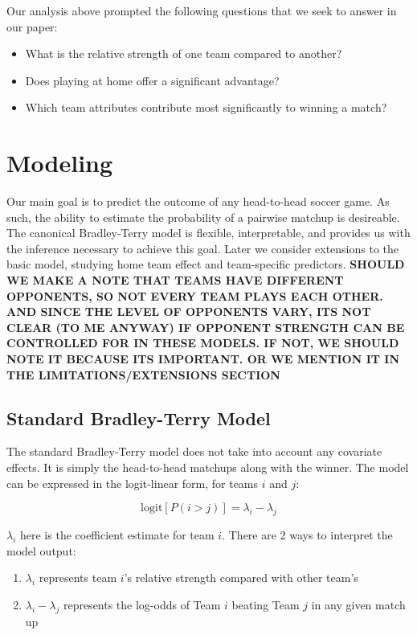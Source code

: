 \documentclass{article}
\begin{document}
Our analysis above prompted the following questions that we seek to answer in our paper:

\begin{itemize}
	\item What is the relative strength of one team compared to another?
	\item Does playing at home offer a significant advantage?
	\item Which team attributes contribute most significantly to winning a match?
\end{itemize}

\section{Modeling}

Our main goal is to predict the outcome of any head-to-head soccer game. As such, the ability to estimate the probability of a pairwise matchup is desireable. The canonical Bradley-Terry model is flexible, interpretable, and provides us with the inference necessary to achieve this goal. Later we consider extensions to the basic model, studying home team effect and team-specific predictors. \textbf{SHOULD WE MAKE A NOTE THAT TEAMS HAVE DIFFERENT OPPONENTS, SO NOT EVERY TEAM PLAYS EACH OTHER. AND SINCE THE LEVEL OF OPPONENTS VARY, ITS NOT CLEAR  (TO ME ANYWAY) IF OPPONENT STRENGTH CAN BE CONTROLLED FOR IN THESE MODELS. IF NOT, WE SHOULD NOTE IT BECAUSE ITS IMPORTANT. OR WE MENTION IT IN THE LIMITATIONS/EXTENSIONS SECTION}

\subsection{Standard Bradley-Terry Model}

The standard Bradley-Terry model does not take into account any covariate effects. It is simply the head-to-head matchups along with the winner. The model can be expressed in the logit-linear form, for teams $i$ and $j$:

$$\text{logit}[P(i > j)] = \lambda_i - \lambda_j$$

$\lambda_i$ here is the coefficient estimate for team $i$. There are 2 ways to interpret the model output:

\begin{enumerate}
	\item $\lambda_i$ represents team $i$'s relative strength compared with other team's
	\item $\lambda_i - \lambda_j$ represents the log-odds of Team $i$ beating Team $j$ in any given match up
\end{enumerate}
\end{document}
